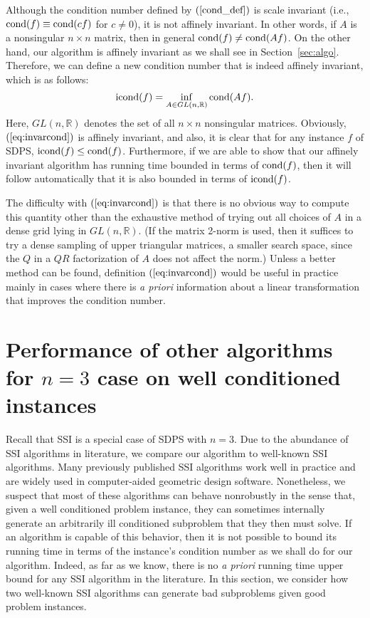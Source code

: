 \documentclass{article}
\newcommand{\cond}[1]{\mathop{\rm{cond}}(#1)}
\newcommand{\icond}[1]{\mathop{\rm{icond}}(#1)}
\newcommand\eref[1]{$(\ref{#1})$}
\begin{document}
Although the condition number defined by \eref{cond_def} is scale invariant
(i.e., $\cond{f}\equiv\cond{cf}$ for $c\ne 0$), it is not
affinely invariant.
In other words, if $A$ is a nonsingular $n \times n$ matrix, then
in general $\cond{f}\ne\cond{Af}$.  On the other hand, our algorithm
is affinely invariant as we shall see in Section~\ref{sec:algo}.  Therefore,
we can define a new condition number that is indeed affinely invariant,
which is as follows:
\begin{equation}
\icond{f}=\inf_{A\in GL(n,\mathbb{R})}\cond{Af}.
\label{eq:invarcond}
\end{equation}
Here, $GL(n,\mathbb{R})$ denotes the set of all $n\times n$ nonsingular
matrices.
Obviously, \eref{eq:invarcond} is affinely invariant, and also,
it is clear that for any instance $f$ of SDPS, $\icond{f}\le\cond{f}$.
Furthermore, if we are able to show that our affinely invariant algorithm
has running time bounded in terms of $\cond{f}$, then it will follow
automatically that it is also bounded in terms of $\icond{f}$.

The difficulty with \eref{eq:invarcond} is that there is no obvious
way to compute this quantity other than the exhaustive
method of trying out all choices of $A$
in a dense grid lying in $GL(n,\mathbb{R})$.  (If the matrix 2-norm is
used, then it suffices to try a dense sampling of upper triangular matrices,
a smaller search space,
since the $Q$ in a $QR$ factorization of $A$ does not affect the norm.)
Unless a better method
can be found,  
definition \eref{eq:invarcond}
would be useful in practice
mainly in cases where there is {\em a priori} information
about a linear transformation that improves the condition number.



\section{Performance of other algorithms for $n=3$ case on well conditioned instances}
\label{section_other}

Recall that SSI is a special case of SDPS with $n=3$.  Due to the 
abundance of SSI algorithms in literature, we compare our algorithm to well-known SSI algorithms.  Many previously published SSI algorithms work
well in practice and are widely used in computer-aided geometric design software.  Nonetheless, we
suspect that most of these algorithms can behave nonrobustly in the sense
that, given a well conditioned problem instance, they can sometimes internally
generate an arbitrarily ill conditioned subproblem that they then
must solve.  If an algorithm
is capable of this behavior, then it is not possible to bound
its running time in terms of the instance's condition number as we shall do
for our algorithm.
Indeed, as far as we know, there is no \emph{a priori} running time upper bound for any SSI algorithm in the literature.
In this section, we consider how two well-known SSI
algorithms can generate bad subproblems given good problem instances.
\end{document}
